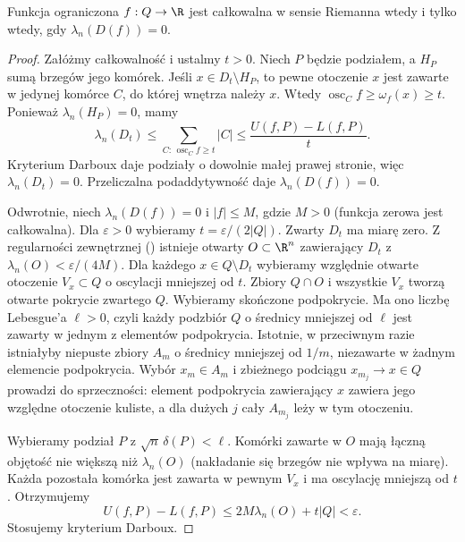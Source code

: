 \begin{twierdzenie}
\label{ma2:thm:riemann-box-lebesgue-criterion}
Funkcja ograniczona $f:Q\to\R$ jest całkowalna
w sensie Riemanna wtedy i tylko wtedy, gdy
$\lambda_n(D(f))=0$.
\end{twierdzenie}
\begin{proof}
Załóżmy całkowalność i ustalmy $t>0$.
Niech $P$ będzie podziałem, a $H_P$ sumą brzegów
jego komórek. Jeśli $x\in D_t\setminus H_P$,
to pewne otoczenie $x$ jest zawarte w jedynej
komórce $C$, do której wnętrza należy $x$.
Wtedy $\operatorname{osc}_Cf\ge\omega_f(x)\ge t$.
Ponieważ $\lambda_n(H_P)=0$, mamy
\[
 \lambda_n(D_t)\le
 \sum_{C:\,\operatorname{osc}_Cf\ge t}|C|
 \le\frac{U(f,P)-L(f,P)}{t}.
\]
Kryterium Darboux daje podziały o dowolnie
małej prawej stronie, więc $\lambda_n(D_t)=0$.
Przeliczalna podaddytywność daje $\lambda_n(D(f))=0$.

Odwrotnie, niech $\lambda_n(D(f))=0$ i $|f|\le M$,
gdzie $M>0$ (funkcja zerowa jest całkowalna).
Dla $\varepsilon>0$ wybieramy $t=\varepsilon/(2|Q|)$.
Zwarty $D_t$ ma miarę zero. Z regularności zewnętrznej
()
istnieje otwarty $O\subset\R^n$ zawierający $D_t$
z $\lambda_n(O)<\varepsilon/(4M)$.
Dla każdego $x\in Q\setminus D_t$ wybieramy
względnie otwarte otoczenie $V_x\subset Q$
o oscylacji mniejszej od $t$.
Zbiory $Q\cap O$ i wszystkie $V_x$ tworzą otwarte
pokrycie zwartego $Q$. Wybieramy skończone podpokrycie.
Ma ono liczbę Lebesgue'a $\ell>0$, czyli każdy
podzbiór $Q$ o średnicy mniejszej od $\ell$
jest zawarty w jednym z elementów podpokrycia.
Istotnie, w przeciwnym razie istniałyby niepuste
zbiory $A_m$ o średnicy mniejszej od $1/m$,
niezawarte w żadnym elemencie podpokrycia.
Wybór $x_m\in A_m$ i zbieżnego podciągu
$x_{m_j}\to x\in Q$ prowadzi do sprzeczności:
element podpokrycia zawierający $x$ zawiera
jego względne otoczenie kuliste, a dla dużych $j$
cały $A_{m_j}$ leży w tym otoczeniu.

Wybieramy podział $P$ z $\sqrt n\,\delta(P)<\ell$.
Komórki zawarte w $O$ mają łączną objętość
nie większą niż $\lambda_n(O)$ (nakładanie się
brzegów nie wpływa na miarę). Każda pozostała
komórka jest zawarta w pewnym $V_x$ i ma
oscylację mniejszą od $t$. Otrzymujemy
\[
 U(f,P)-L(f,P)\le 2M\lambda_n(O)+t|Q|<\varepsilon.
\]
Stosujemy kryterium Darboux.
\end{proof}


